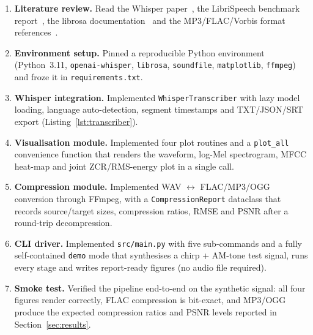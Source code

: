 \documentclass[twocolumn,10pt,a4paper]{article}
\begin{document}
\begin{enumerate}
  \item \textbf{Literature review.}  Read the Whisper paper~\cite{radford2022whisper},
        the LibriSpeech benchmark report~\cite{panayotov2015librispeech},
        the librosa documentation~\cite{mcfee2015librosa} and the MP3/FLAC/Vorbis
        format references~\cite{brandenburg1999mp3,xiph2004vorbis,coalson2008flac}.
  \item \textbf{Environment setup.}  Pinned a reproducible Python
        environment (Python~3.11, \texttt{openai-whisper}, \texttt{librosa},
        \texttt{soundfile}, \texttt{matplotlib}, \texttt{ffmpeg}) and froze it
        in \texttt{requirements.txt}.
  \item \textbf{Whisper integration.}  Implemented
        \texttt{WhisperTranscriber} with lazy model loading, language
        auto-detection, segment timestamps and TXT/JSON/SRT export
        (Listing~\ref{lst:transcriber}).
  \item \textbf{Visualisation module.}  Implemented four plot routines and
        a \texttt{plot\_all} convenience function that renders the
        waveform, log-Mel spectrogram, MFCC heat-map and joint
        ZCR/RMS-energy plot in a single call.
  \item \textbf{Compression module.}  Implemented WAV $\leftrightarrow$
        FLAC/MP3/OGG conversion through FFmpeg, with a
        \texttt{CompressionReport} dataclass that records source/target
        sizes, compression ratios, RMSE and PSNR after a round-trip
        decompression.
  \item \textbf{CLI driver.}  Implemented \texttt{src/main.py} with five
        sub-commands and a fully self-contained \texttt{demo} mode that
        synthesises a chirp + AM-tone test signal, runs every stage and
        writes report-ready figures (no audio file required).
  \item \textbf{Smoke test.}  Verified the pipeline end-to-end on the
        synthetic signal: all four figures render correctly,
        FLAC compression is bit-exact, and MP3/OGG produce the expected
        compression ratios and PSNR levels reported in
        Section~\ref{sec:results}.
\end{enumerate}
\end{document}
